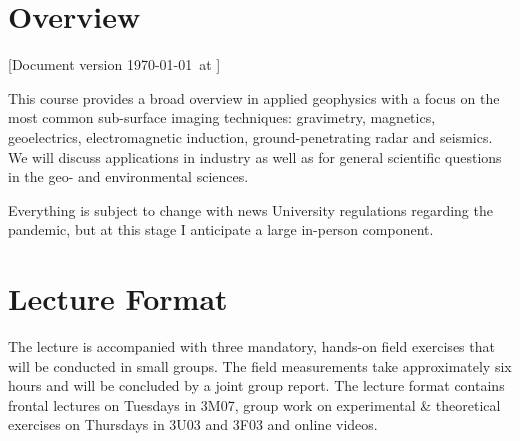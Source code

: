 \documentclass[letterpaper]{inzane_syllabus} %
\begin{document}

\makeprofile %

\section{Overview}

\small [Document version \today\ at \currenttime \normalsize]

This course provides a broad overview in applied geophysics with a focus on the most common sub-surface imaging techniques: gravimetry, magnetics, geoelectrics, electromagnetic induction, ground-penetrating radar and seismics. We will discuss applications in industry as well as for general scientific questions in the geo- and environmental sciences. 

Everything is subject to change with news University regulations regarding the pandemic, but at this stage I anticipate a large in-person component.

\section{Lecture Format}

The lecture is accompanied with three mandatory, hands-on field exercises that will be conducted in small groups. The field measurements take approximately six hours and will be concluded by a joint group report. The lecture format contains frontal lectures on Tuesdays in 3M07, group work on experimental \& theoretical exercises on Thursdays in 3U03 and 3F03 and online videos. 

\end{document}
